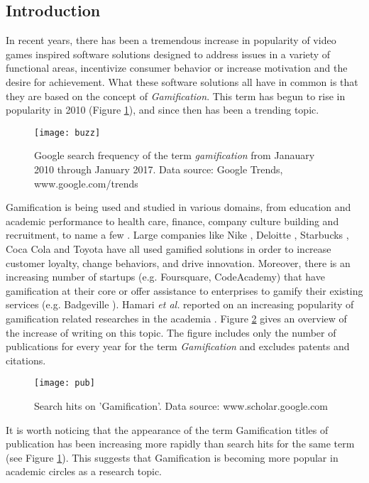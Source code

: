 \subsection{Introduction}
In recent years, there has been a tremendous increase in popularity of video games inspired software solutions designed to address issues in a variety of functional areas, incentivize consumer behavior or increase motivation and the desire for achievement. What these software solutions all have in common is that they are based on the concept of \textit{Gamification}. This term has begun to rise in popularity in 2010 (Figure \ref{fig:buzz}), and since then has been a trending topic. %
\begin{figure}[h]
    \centering
    \texttt{[image: buzz]}
    \caption{Google search frequency of the term \textit{gamification} from Janauary 2010 through January 2017. Data source: Google Trends, www.google.com/trends}
    \label{fig:buzz}
\end{figure}
Gamification is being used and studied in various domains, from education and academic performance to health care, finance, company culture building and recruitment, to name a few \cite{gamificationExamples, gamificationWiki, enterpriseGamify}. Large companies like Nike \cite{nikePlus}, Deloitte \cite{deloitte}, Starbucks \cite{starbucks}, Coca Cola \cite{coke} and Toyota \cite{toyota} have all used gamified solutions in order to increase customer loyalty, change behaviors, 
and drive innovation. %
Moreover, there is an increasing number of startups (e.g. Foursquare, CodeAcademy) that have gamification  at  their  core \cite{codeacademy} or offer assistance to enterprises to gamify their existing services (e.g. Badgeville \cite{badgeville}). Hamari \textit{et al.} reported on an increasing popularity of gamification related researches in the academia \cite{hamari2014does}. Figure \ref{fig:pub} gives an overview of the increase of writing on this topic. The figure includes only the number of publications for every year for the term \textit{Gamification} and excludes patents and citations. 
\begin{figure}[h]
    \centering
    \texttt{[image: pub]}
    \caption{Search hits on 'Gamification'. Data source: www.scholar.google.com}
    \label{fig:pub}
\end{figure}
It is worth noticing that the appearance of the term Gamification titles of publication has been increasing more rapidly than search hits for the same term (see Figure \ref{fig:buzz}). This suggests that Gamification is becoming more popular in academic circles as a research topic. 
